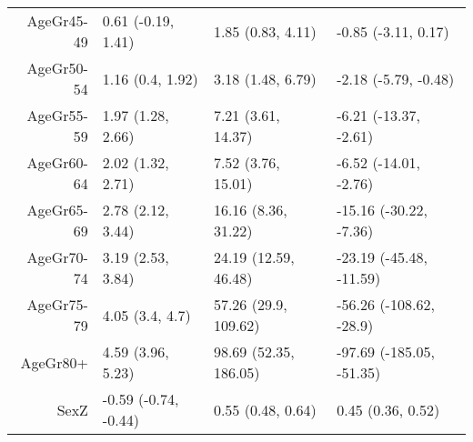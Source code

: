 \begin{table}[ht]
\begin{tabular}{rlll}
  AgeGr45-49 & 0.61 (-0.19, 1.41) & 1.85 (0.83, 4.11) & -0.85 (-3.11, 0.17) \\ 
  AgeGr50-54 & 1.16 (0.4, 1.92) & 3.18 (1.48, 6.79) & -2.18 (-5.79, -0.48) \\ 
  AgeGr55-59 & 1.97 (1.28, 2.66) & 7.21 (3.61, 14.37) & -6.21 (-13.37, -2.61) \\ 
  AgeGr60-64 & 2.02 (1.32, 2.71) & 7.52 (3.76, 15.01) & -6.52 (-14.01, -2.76) \\ 
  AgeGr65-69 & 2.78 (2.12, 3.44) & 16.16 (8.36, 31.22) & -15.16 (-30.22, -7.36) \\ 
  AgeGr70-74 & 3.19 (2.53, 3.84) & 24.19 (12.59, 46.48) & -23.19 (-45.48, -11.59) \\ 
  AgeGr75-79 & 4.05 (3.4, 4.7) & 57.26 (29.9, 109.62) & -56.26 (-108.62, -28.9) \\ 
  AgeGr80+ & 4.59 (3.96, 5.23) & 98.69 (52.35, 186.05) & -97.69 (-185.05, -51.35) \\ 
  SexZ & -0.59 (-0.74, -0.44) & 0.55 (0.48, 0.64) & 0.45 (0.36, 0.52) \\ 
   \hline
\end{tabular}
\end{table}
